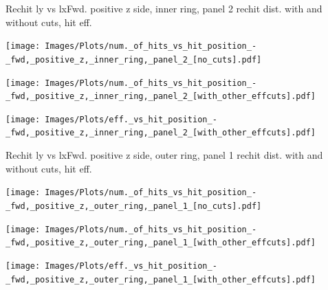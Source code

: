 \documentclass{beamer}
\begin{document}
\begin{frame}{Rechit ly vs lx}{Fwd. positive z side, inner ring, panel 2 rechit dist. with and without cuts, hit eff.}
  \begin{minipage}{0.32\textwidth}
    \centering
    \texttt{[image: Images/Plots/num.\_of\_hits\_vs\_hit\_position\_-\_fwd,\_positive\_z,\_inner\_ring,\_panel\_2\_[no\_cuts].pdf]}
  \end{minipage}%
  \begin{minipage}{0.32\textwidth}
    \centering
    \texttt{[image: Images/Plots/num.\_of\_hits\_vs\_hit\_position\_-\_fwd,\_positive\_z,\_inner\_ring,\_panel\_2\_[with\_other\_effcuts].pdf]}
  \end{minipage}%
  \begin{minipage}{0.32\textwidth}
    \centering
    \texttt{[image: Images/Plots/eff.\_vs\_hit\_position\_-\_fwd,\_positive\_z,\_inner\_ring,\_panel\_2\_[with\_other\_effcuts].pdf]}
  \end{minipage}
\end{frame}

\begin{frame}{Rechit ly vs lx}{Fwd. positive z side, outer ring, panel 1 rechit dist. with and without cuts, hit eff.}
  \begin{minipage}{0.32\textwidth}
    \centering
    \texttt{[image: Images/Plots/num.\_of\_hits\_vs\_hit\_position\_-\_fwd,\_positive\_z,\_outer\_ring,\_panel\_1\_[no\_cuts].pdf]}
  \end{minipage}%
  \begin{minipage}{0.32\textwidth}
    \centering
    \texttt{[image: Images/Plots/num.\_of\_hits\_vs\_hit\_position\_-\_fwd,\_positive\_z,\_outer\_ring,\_panel\_1\_[with\_other\_effcuts].pdf]}
  \end{minipage}%
  \begin{minipage}{0.32\textwidth}
    \centering
    \texttt{[image: Images/Plots/eff.\_vs\_hit\_position\_-\_fwd,\_positive\_z,\_outer\_ring,\_panel\_1\_[with\_other\_effcuts].pdf]}
  \end{minipage}
\end{frame}
\end{document}
